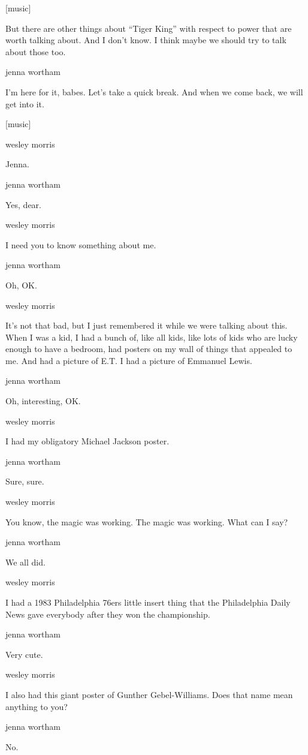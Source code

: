 {[}music{]}

But there are other things about ``Tiger King'' with respect to power
that are worth talking about. And I don't know. I think maybe we should
try to talk about those too.

jenna wortham

I'm here for it, babes. Let's take a quick break. And when we come back,
we will get into it.

{[}music{]}

wesley morris

Jenna.

jenna wortham

Yes, dear.

wesley morris

I need you to know something about me.

jenna wortham

Oh, OK.

wesley morris

It's not that bad, but I just remembered it while we were talking about
this. When I was a kid, I had a bunch of, like all kids, like lots of
kids who are lucky enough to have a bedroom, had posters on my wall of
things that appealed to me. And had a picture of E.T. I had a picture of
Emmanuel Lewis.

jenna wortham

Oh, interesting, OK.

wesley morris

I had my obligatory Michael Jackson poster.

jenna wortham

Sure, sure.

wesley morris

You know, the magic was working. The magic was working. What can I say?

jenna wortham

We all did.

wesley morris

I had a 1983 Philadelphia 76ers little insert thing that the
Philadelphia Daily News gave everybody after they won the championship.

jenna wortham

Very cute.

wesley morris

I also had this giant poster of Gunther Gebel-Williams. Does that name
mean anything to you?

jenna wortham

No.


